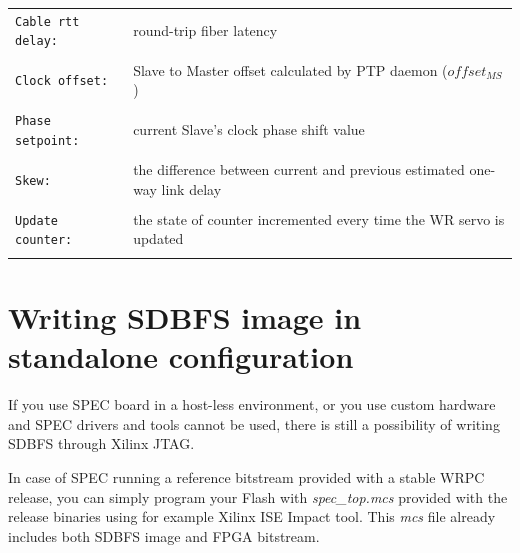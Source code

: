 \documentclass[a4paper, 12pt]{article}
\newcommand{\code}[1]{\texttt{#1}}
\newcommand{\codeHook}[1]{\mbox{\ttfamily\MakeTextUppercase{#1}}}
\begin{document}
\begin{longtable}{  p{8cm}  p{6cm} }
  \code{Cable rtt delay:} & round-trip fiber latency\\
 & \\

  \code{Clock offset:} & Slave to Master offset calculated by \codeHook{ptp} daemon
(\( offset_{MS} \))\\
 & \\

  \code{Phase setpoint:} & current Slave's clock phase shift value\\
 & \\

  \code{Skew:} & the difference between current and previous estimated
one-way link delay\\
 & \\

  \code{Update counter:} & the state of counter incremented every time
the \codeHook{wr} servo is updated\\
 & \\

\end{longtable}



\clearpage
\label{Writing SDBFS image in standalone configuration}
\section{Writing SDBFS image in standalone configuration}

If you use \codeHook{spec} board in a host-less environment, or you use custom
hardware and \codeHook{spec} drivers and tools cannot be used, there is still a
possibility of writing \codeHook{sdbfs} through Xilinx JTAG.

\vspace{1em}
In case of \codeHook{spec} running a reference bitstream provided with a stable
\codeHook{wrpc} release, you can simply program your Flash with \textit{spec\_top.mcs}
provided with the release binaries using for example Xilinx ISE Impact tool.
This \textit{mcs} file already includes both \codeHook{sdbfs} image and FPGA bitstream.
\end{document}
